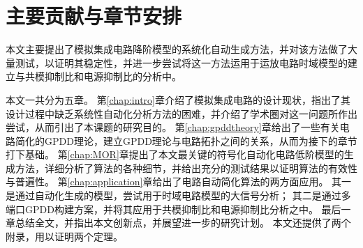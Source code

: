 \section{主要贡献与章节安排}
\label{sec:intro:org}

本文主要提出了模拟集成电路降阶模型的系统化自动生成方法，并对该方法做了大量测试，以证明其稳定性，并进一步尝试将这一方法运用于运放电路时域模型的建立与共模抑制比和电源抑制比的分析中。

本文一共分为五章。
第\ref{chap:intro}章介绍了模拟集成电路的设计现状，指出了其设计过程中缺乏系统性自动化分析方法的困难，并介绍了学术圈对这一问题所作出尝试，从而引出了本课题的研究目的。
第\ref{chap:gpddtheory}章给出了一些有关电路简化的GPDD理论，建立GPDD理论与电路拓扑之间的关系，从而为接下的章节打下基础。
第\ref{chap:MOR}章提出了本文最关键的符号化自动化电路低阶模型的生成方法，详细分析了算法的各种细节，并给出充分的测试结果以证明算法的有效性与普遍性。
第\ref{chap:application}章给出了电路自动简化算法的两方面应用。
其一是通过自动化生成的模型，尝试用于时域电路模型的大信号分析；
其二是通过多端口GPDD构建方案，并将其应用于共模抑制比和电源抑制比分析之中。
最后一章总结全文，并指出本文创新点，并展望进一步的研究计划。
本文还提供了两个附录，用以证明两个定理。